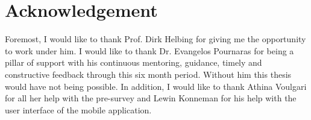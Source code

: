 \chapter*{Acknowledgement}

Foremost, I would like to thank Prof. Dirk Helbing for giving me the opportunity to work under him. I would like to thank Dr. Evangelos Pournaras for being a pillar of support with his continuous mentoring, guidance, timely and constructive feedback through this six month period. Without him this thesis would have not being possible. In addition, I would like to thank Athina Voulgari for all her help with the pre-survey and Lewin Konneman for his help with the user interface of the mobile application.